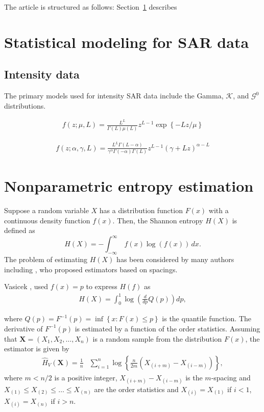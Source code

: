 \documentclass[conference]{IEEEtran}
\begin{document}
The article is structured as follows: 
Section~\ref{sec_02} describes 

\section{Statistical modeling for SAR data}\label{sec_02}

\subsection{Intensity data}

The primary models used for intensity SAR data include the Gamma, $\mathcal{K}$, and $\mathcal{G}^0$ distributions. 


\begin{align}
	f(z; \mu, L)=\frac{L^L}{\Gamma(L)\mu(L)}z^{L-1}\exp\left\{-Lz/\mu\right\}
\end{align}

\begin{align}
	f(z; \alpha, \gamma, L)=\frac{L^L\Gamma(L-\alpha)}{\gamma^{\alpha}\Gamma(-\alpha)\Gamma(L)}z^{L-1}(\gamma+Lz)^{\alpha-L}
\end{align}


\section{Nonparametric entropy estimation}



Suppose a random variable $X$ has a distribution function $F(x)$ with a continuous density function $f(x)$. Then, the Shannon entropy $H(X)$ is defined as
\begin{equation*}
  H(X)=-\int_{-\infty }^\infty \ f(x)\log(f(x))\,dx.
\end{equation*}
The problem of estimating $H(X)$ has been considered by many authors including \cite{vasicek1976test, van1992, Wieczorkowski1999, correa1995new}, who proposed estimators based on spacings.

Vasicek \cite{vasicek1976test}, used $f(x)=p$  to express $ H(f)$ as
\begin{align*}
	H(X)= \int_0^1 \log\left(\frac{d}{dp}Q(p)\right)dp,
\end{align*}

where $Q(p)=F^{-1}(p)=\inf\left\{x: F(x)\leq p\right\}$ is the quantile function. The derivative of $F^{-1}(p)$ is  estimated by a function of the order statistics.
Assuming that  $\bm{X}=(X_1, X_2, \ldots,X_n)$ is a random sample from the distribution $F(x)$, the estimator is given by
\begin{align*}
	\widehat{H}_{V}(\bm{X})=\frac{1}{n}&\sum_{i=1}^{n}\log\left\{\frac{n}{2m}\left(X_{(i+m)}-X_{(i-m)}\right)\right\},
	\end{align*}
where $m<n/2$ is a positive integer, $X_{(i+m)}-X_{(i-m)}$ is the $m$-spacing and $X_{(1)}\leq X_{(2)}\leq\ldots\leq X_{(n)}$ are the order statistics and $X_{(i)}= X_{(1)}$ if $i<1$, $X_{(i)}= X_{(n)}$ if $i>n$.
\end{document}
